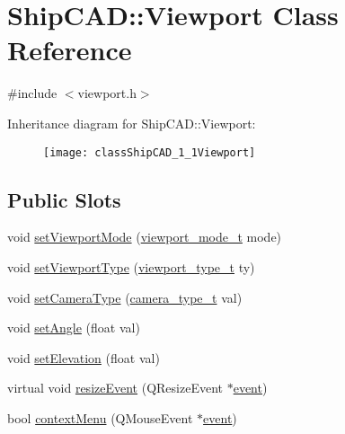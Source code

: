 \hypertarget{classShipCAD_1_1Viewport}{}\section{Ship\+C\+AD\+:\+:Viewport Class Reference}
\label{classShipCAD_1_1Viewport}


{\ttfamily \#include $<$viewport.\+h$>$}

Inheritance diagram for Ship\+C\+AD\+:\+:Viewport\+:\begin{figure}[H]
\begin{center}
\leavevmode
\texttt{[image: classShipCAD\_1\_1Viewport]}
\end{center}
\end{figure}
\subsection*{Public Slots}
\begin{DoxyCompactItemize}
\item 
void \hyperlink{classShipCAD_1_1Viewport_a578ac5ee96e36638739517fa21bf70c0}{set\+Viewport\+Mode} (\hyperlink{namespaceShipCAD_a67437198ee14f74e6c5277d761894863}{viewport\+\_\+mode\+\_\+t} mode)
\item 
void \hyperlink{classShipCAD_1_1Viewport_a554a3455c39ee5652b13c9b24c3c962e}{set\+Viewport\+Type} (\hyperlink{namespaceShipCAD_aeeeb05810f2e31ef89fd4ac6b6ba9c0a}{viewport\+\_\+type\+\_\+t} ty)
\item 
void \hyperlink{classShipCAD_1_1Viewport_a5f90a885e0204b32ff9795c4b79f824b}{set\+Camera\+Type} (\hyperlink{namespaceShipCAD_a58f51ebd2e66de5e41c2ffd6f434241e}{camera\+\_\+type\+\_\+t} val)
\item 
void \hyperlink{classShipCAD_1_1Viewport_a00ba2139fa06701b65de70d5c657f5d6}{set\+Angle} (float val)
\item 
void \hyperlink{classShipCAD_1_1Viewport_a4bda4b742dc477ed5dc2ab6ac7fe92bc}{set\+Elevation} (float val)
\item 
virtual void \hyperlink{classShipCAD_1_1Viewport_a4eeeb100fd88487215bb7794bdf5e0cb}{resize\+Event} (Q\+Resize\+Event $\ast$\hyperlink{classOpenGLWindow_a1e3045cffb900de55b7384f5091c9d94}{event})
\item 
bool \hyperlink{classShipCAD_1_1Viewport_ab247f28eb569e160142901b6eef265a3}{context\+Menu} (Q\+Mouse\+Event $\ast$\hyperlink{classOpenGLWindow_a1e3045cffb900de55b7384f5091c9d94}{event})
\end{DoxyCompactItemize}
